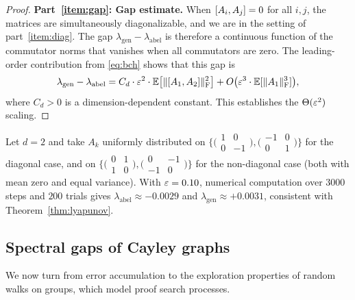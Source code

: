 \begin{proof}
\medskip
\noindent\textbf{Part~\ref{item:gap}: Gap estimate.}
When $[A_i, A_j] = 0$ for all $i, j$, the matrices are
simultaneously diagonalizable, and we are in the setting of
part~\ref{item:diag}.  The gap $\lambda_{\mathrm{gen}} - \lambda_{\mathrm{abel}}$
is therefore a continuous function of the commutator norms that vanishes
when all commutators are zero.  The leading-order contribution from
\eqref{eq:bch} shows that this gap is
\[
  \lambda_{\mathrm{gen}} - \lambda_{\mathrm{abel}}
  = C_d \cdot \varepsilon^2 \cdot \mathbb{E}\bigl[\lVert [A_1, A_2] \rVert_{\mathrm{F}}^2\bigr]
    + O\bigl(\varepsilon^3 \cdot \mathbb{E}[\lVert A_1 \rVert_{\mathrm{F}}^3]\bigr),
\]
where $C_d > 0$ is a dimension-dependent constant.  This establishes
the $\Theta(\varepsilon^2)$ scaling.
\end{proof}

\begin{example}\label{ex:2d}
Let $d = 2$ and take $A_k$ uniformly distributed on
$\bigl\{\bigl(\begin{smallmatrix} 1 & 0 \\ 0 & -1 \end{smallmatrix}\bigr),
\bigl(\begin{smallmatrix} -1 & 0 \\ 0 & 1 \end{smallmatrix}\bigr)\bigr\}$
for the diagonal case, and on
$\bigl\{\bigl(\begin{smallmatrix} 0 & 1 \\ 1 & 0 \end{smallmatrix}\bigr),
\bigl(\begin{smallmatrix} 0 & -1 \\ -1 & 0 \end{smallmatrix}\bigr)\bigr\}$
for the non-diagonal case (both with mean zero and equal variance).
With $\varepsilon = 0.10$, numerical computation over $3000$ steps and $200$
trials gives $\lambda_{\mathrm{abel}} \approx -0.0029$ and
$\lambda_{\mathrm{gen}} \approx +0.0031$, consistent with
Theorem~\ref{thm:lyapunov}.
\end{example}

\subsection{Spectral gaps of Cayley graphs}

We now turn from error accumulation to the exploration properties of
random walks on groups, which model proof search processes.


